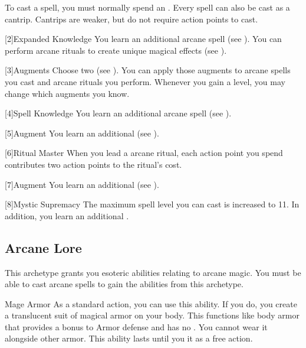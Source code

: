         To cast a spell, you must normally spend an .
        Every spell can also be cast as a cantrip.
        Cantrips are weaker, but do not require action points to cast.

        [2]{Expanded Knowledge}
         You learn an additional arcane spell (see ).
         You can perform arcane rituals to create unique magical effects (see ).

        [3]{Augments}
        Choose two  (see ).
        You can apply those augments to arcane spells you cast and arcane rituals you perform.
        Whenever you gain a level, you may change which augments you know.

        [4]{Spell Knowledge}
        You learn an additional arcane spell (see ).

        [5]{Augment}
        You learn an additional  (see ).

        [6]{Ritual Master}
        When you lead a arcane ritual, each action point you spend contributes two action points to the ritual's cost.

        [7]{Augment}
        You learn an additional  (see ).

        [8]{Mystic Supremacy}
        The maximum spell level you can cast is increased to 11.
        In addition, you learn an additional .

    \subsection{Arcane Lore}
        This archetype grants you esoteric abilities relating to arcane magic.
        You must be able to cast arcane spells to gain the abilities from this archetype.

        \begin{ability}{Mage Armor}
            As a standard action, you can use this ability.
            If you do, you create a translucent suit of magical armor on your body.
            This functions like body armor that provides a  bonus to Armor defense and has no .
            You cannot wear it alongside other armor.
            This ability lasts until you  it as a free action.
        \end{ability}

